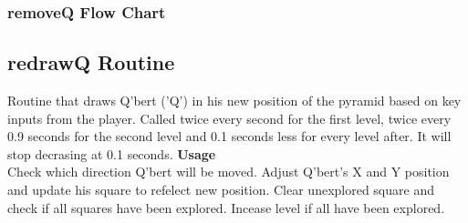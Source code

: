   \subsubsection{removeQ Flow Chart}
  \begin{center}
  \end{center}

\newpage
  \subsection{redrawQ Routine}
   \indent
     Routine that draws Q'bert ('Q') in his new position of the pyramid based
     on key inputs from the player. Called twice every second for the first level,
     twice every 0.9 seconds for the second level and 0.1 seconds less for every
     level after. It will stop decrasing at 0.1 seconds.
   \vskip 8pt
   \noindent
   {\bf Usage }\\
	Check which direction Q'bert will be moved. Adjust Q'bert's X and Y 
	position and update his square to refelect new position. Clear unexplored
	square and check if all squares have been explored. Incease level if all have
 	been explored.  
 \vskip 8pt
  \noindent

\newpage
